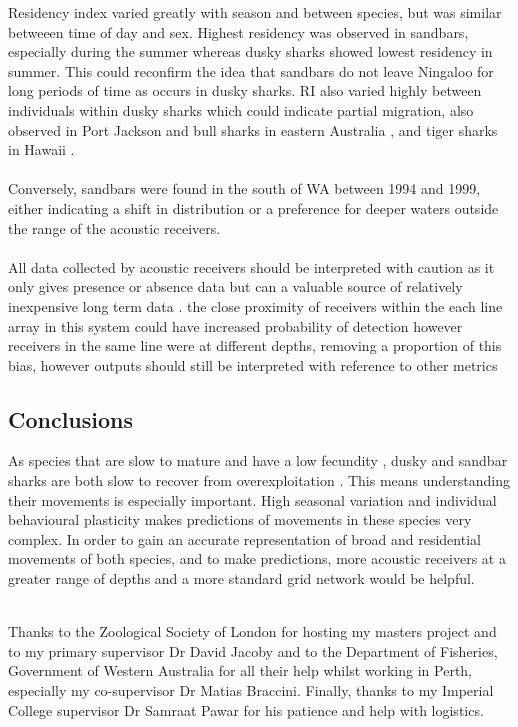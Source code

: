 \documentclass[11pt,a4paper]{article}
\begin{document}
	Residency index varied greatly with season and between species, but was similar betweeen time of day and sex. Highest residency was observed in sandbars, especially during the summer whereas dusky sharks showed lowest residency in summer. This could reconfirm the idea that sandbars do not leave Ningaloo for long periods of time as occurs in dusky sharks. RI also varied highly between individuals within dusky sharks which could indicate partial migration, also observed in Port Jackson and bull sharks in eastern Australia \citep{Bass2017,Espinoza2016}, and tiger sharks in Hawaii \citep{Papastamatiou2013}.\\
	\\
	Conversely, sandbars were found in the south of WA between 1994 and 1999, either indicating a shift in distribution or a preference for deeper waters \citep{Mcauley2003} outside the range of the acoustic receivers.\\
	\\
	All data collected by acoustic receivers should be interpreted with caution as it only gives presence or absence data but can a valuable source of relatively inexpensive long term data \citep{Speed2010,Bass2017}. the close proximity of receivers within the each line array in this system could have increased probability of detection however receivers in the same line were at different depths, removing a proportion of this bias, however outputs should still be interpreted with reference to other metrics

	\subsection{Conclusions}
	
	As species that are slow to mature and have a low fecundity \citep{Cortes2000}, dusky and sandbar sharks are both slow to recover from overexploitation \citep{Rogers2013}. This means understanding their movements is especially important. High seasonal variation and individual behavioural plasticity makes predictions of movements in these species very complex. In order to gain an accurate representation of broad and residential movements of both species, and to make predictions, more acoustic receivers at a greater range of depths and a more standard grid network would be helpful.
	\newpage
	
	\\
	
	Thanks to the Zoological Society of London for hosting my masters project and to my primary supervisor Dr David Jacoby and to the Department of Fisheries, Government of Western Australia for all their help whilst working in Perth, especially my co-supervisor Dr Matias Braccini. Finally, thanks to my Imperial College supervisor Dr Samraat Pawar for his patience and help with logistics.\\
	
\end{document}
